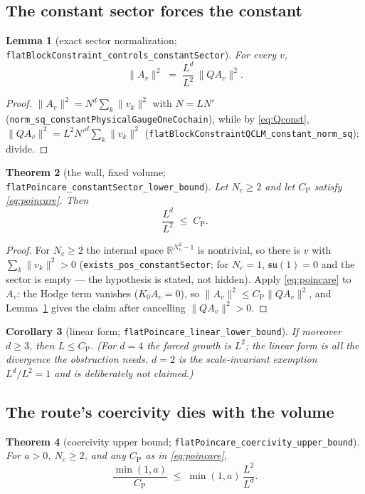 \documentclass[11pt]{article}
\newtheorem{theorem}{Theorem}[section]
\newtheorem{lemma}[theorem]{Lemma}
\newtheorem{corollary}[theorem]{Corollary}
\theoremstyle{definition}
\newcommand{\lean}[1]{\texttt{#1}}
\newcommand{\R}{\mathbb{R}}
\newcommand{\su}{\mathfrak{su}}
\newcommand{\CP}{C_{\mathrm{P}}}
\begin{document}
\subsection{The constant sector forces the constant}

\begin{lemma}[exact sector normalization;
\lean{flatBlockConstraint\_controls\_constantSector}]\label{lem:sector}
For every $v$,
\[
\|A_v\|^2 \;=\; \frac{L^d}{L^2}\,\|Q A_v\|^2 .
\]
\end{lemma}

\begin{proof}
$\|A_v\|^2 = N^d\sum_k\|v_k\|^2$ with $N=LN'$
(\lean{norm\_sq\_constantPhysicalGaugeOneCochain}), while by
\eqref{eq:Qconst},
$\|QA_v\|^2 = L^2 N'^d \sum_k\|v_k\|^2$
(\lean{flatBlockConstraintQCLM\_constant\_norm\_sq}); divide.
\end{proof}

\begin{theorem}[the wall, fixed volume;
\lean{flatPoincare\_constantSector\_lower\_bound}]\label{thm:wall}
Let $N_c\ge 2$ and let $\CP$ satisfy \eqref{eq:poincare}.  Then
\[
\frac{L^d}{L^2}\;\le\;\CP .
\]
\end{theorem}

\begin{proof}
For $N_c \ge 2$ the internal space $\R^{N_c^2-1}$ is nontrivial, so
there is $v$ with $\sum_k \|v_k\|^2>0$
(\lean{exists\_pos\_constantSector}; for $N_c=1$, $\su(1)=0$ and the
sector is empty --- the hypothesis is stated, not hidden).  Apply
\eqref{eq:poincare} to $A_v$: the Hodge term vanishes ($K_0A_v=0$), so
$\|A_v\|^2 \le \CP\|QA_v\|^2$, and Lemma~\ref{lem:sector} gives the
claim after cancelling $\|QA_v\|^2>0$.
\end{proof}

\begin{corollary}[linear form;
\lean{flatPoincare\_linear\_lower\_bound}]\label{cor:linear}
If moreover $d\ge 3$, then $L \le \CP$.  (For $d=4$ the forced growth is
$L^2$; the linear form is all the divergence the obstruction needs.
$d=2$ is the scale-invariant exemption $L^d/L^2=1$ and is deliberately
not claimed.)
\end{corollary}

\subsection{The route's coercivity dies with the volume}

\begin{theorem}[coercivity upper bound;
\lean{flatPoincare\_coercivity\_upper\_bound}]
For $a>0$, $N_c\ge2$, and any $\CP$ as in \eqref{eq:poincare},
\[
\frac{\min(1,a)}{\CP} \;\le\; \min(1,a)\,\frac{L^2}{L^d}.
\]
\end{theorem}
\end{document}
